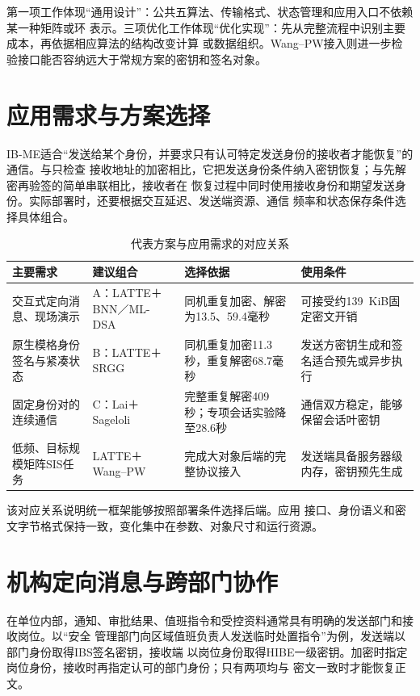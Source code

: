第一项工作体现“通用设计”：公共五算法、传输格式、状态管理和应用入口不依赖某一种矩阵或环
表示。三项优化工作体现“优化实现”：先从完整流程中识别主要成本，再依据相应算法的结构改变计算
或数据组织。Wang--PW接入则进一步检验接口能否容纳远大于常规方案的密钥和签名对象。

\section{应用需求与方案选择}

IB-ME适合“发送给某个身份，并要求只有认可特定发送身份的接收者才能恢复”的通信。与只检查
接收地址的加密相比，它把发送身份条件纳入密钥恢复；与先解密再验签的简单串联相比，接收者在
恢复过程中同时使用接收身份和期望发送身份。实际部署时，还要根据交互延迟、发送端资源、通信
频率和状态保存条件选择具体组合。

\begin{table}[H]
\centering\small
\caption{代表方案与应用需求的对应关系}
\label{tab:application-choice}
\begin{tabularx}{\textwidth}{@{}>{\raggedright\arraybackslash}p{}>{\raggedright\arraybackslash}p{}>{\raggedright\arraybackslash}p{}>{\raggedright\arraybackslash}X@{}}
\toprule
\rowcolor{black!8} 主要需求 & 建议组合 & 选择依据 & 使用条件 \\
\midrule
交互式定向消息、现场演示 & A：LATTE＋BNN／ML-DSA & 同机重复加密、解密为13.5、59.4毫秒 & 可接受约139~KiB固定密文开销 \\
原生模格身份签名与紧凑状态 & B：LATTE＋SRGG & 同机重复加密11.3秒，重复解密68.7毫秒 & 发送方密钥生成和签名适合预先或异步执行 \\
固定身份对的连续通信 & C：Lai＋Sageloli & 完整重复解密409秒；专项会话实验降至28.6秒 & 通信双方稳定，能够保留会话叶密钥 \\
低频、目标规模矩阵SIS任务 & LATTE＋Wang--PW & 完成大对象后端的完整协议接入 & 发送端具备服务器级内存，密钥预先生成 \\
\bottomrule
\end{tabularx}
\end{table}

该对应关系说明统一框架能够按照部署条件选择后端。应用
接口、身份语义和密文字节格式保持一致，变化集中在参数、对象尺寸和运行资源。

\section{机构定向消息与跨部门协作}

在单位内部，通知、审批结果、值班指令和受控资料通常具有明确的发送部门和接收岗位。以“安全
管理部门向区域值班负责人发送临时处置指令”为例，发送端以部门身份取得IBS签名密钥，接收端
以岗位身份取得HIBE一级密钥。加密时指定岗位身份，接收时再指定认可的部门身份；只有两项均与
密文一致时才能恢复正文。

